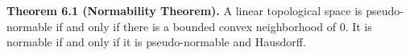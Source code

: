\textbf{Theorem 6.1 (Normability Theorem).} A linear topological space is pseudo-normable if and only if there is a bounded convex neighborhood of $0$. It is normable if and only if it is pseudo-normable and Hausdorff.
